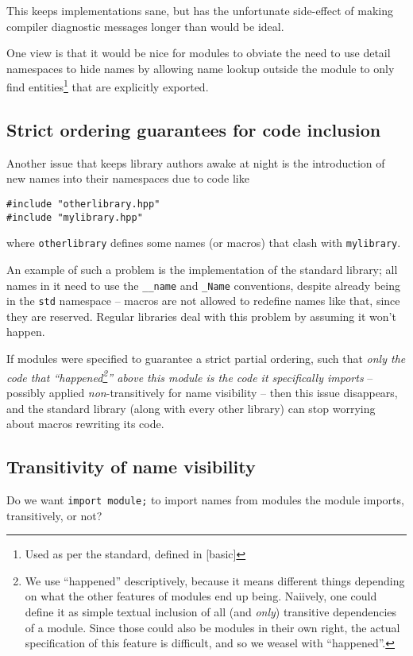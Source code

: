 \documentclass[reqno]{article}
\begin{document}
This keeps implementations sane, but has the unfortunate side-effect of making
compiler diagnostic messages longer than would be ideal.

One view is that it would be nice for modules to obviate the need to use detail
namespaces to hide names by allowing name lookup outside the module to only
find entities\footnote{Used as per the standard, defined in [basic]} that are
explicitly exported.


\subsection{Strict ordering guarantees for code inclusion}

Another issue that keeps library authors awake at night is the introduction of
new names into their namespaces due to code like

\begin{verbatim}
#include "otherlibrary.hpp"
#include "mylibrary.hpp"
\end{verbatim}

where \texttt{otherlibrary} defines some names (or macros) that clash with
\texttt{mylibrary}.

An example of such a problem is the implementation of the standard library; all
names in it need to use the \texttt{\_\_name} and \texttt{\_Name} conventions,
despite already being in the \texttt{std} namespace -- macros are not allowed
to redefine names like that, since they are reserved. Regular libraries deal
with this problem by assuming it won't happen.

If modules were specified to guarantee a strict partial ordering, such that \emph{only
the code that ``happened\footnote{We use ``happened'' descriptively, because
it means different things depending on what the other features of modules end up
being. Naiively, one could define it as simple textual inclusion of all (and
\emph{only}) transitive dependencies of a module. Since those could also be
modules in their own right, the actual specification of this feature is
difficult, and so we weasel with ``happened''.}'' above this module is the code
it specifically imports} -- possibly applied \emph{non}-transitively for name
visibility -- then this issue disappears, and the standard library (along with
every other library) can stop worrying about macros rewriting its code.

\subsection{Transitivity of name visibility}
Do we want \texttt{import module;} to import names from modules the module
imports, transitively, or not?
\end{document}
